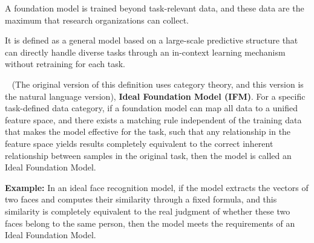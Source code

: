 

\begin{definition}
    A foundation model is trained beyond task-relevant data, and these data are the maximum that research organizations can collect.
    \end{definition}
    
    \begin{definition}
    It is defined as a general model based on a large-scale predictive structure that can directly handle diverse tasks through an in-context learning mechanism without retraining for each task.
    \end{definition}
    
    \begin{definition}~\cite{Yuan23a} (The original version of this definition uses category theory, and this version is the natural language version), \textbf{Ideal Foundation Model (IFM)}. For a specific task-defined data category, if a foundation model can map all data to a unified feature space, and there exists a matching rule independent of the training data that makes the model effective for the task, such that any relationship in the feature space yields results completely equivalent to the correct inherent relationship between samples in the original task, then the model is called an Ideal Foundation Model.
    
    \textbf{Example:} In an ideal face recognition model, if the model extracts the vectors of two faces and computes their similarity through a fixed formula, and this similarity is completely equivalent to the real judgment of whether these two faces belong to the same person, then the model meets the requirements of an Ideal Foundation Model.
    \end{definition}
    
